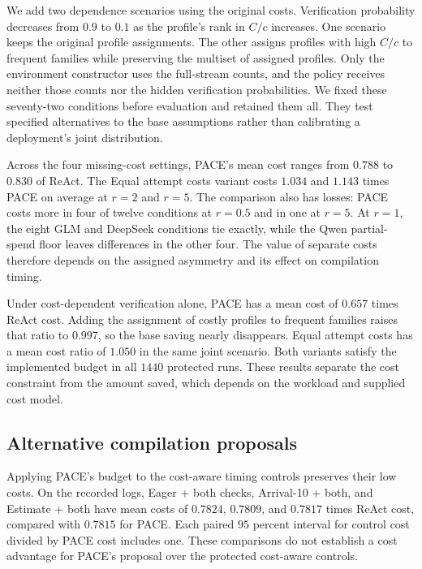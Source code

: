 We add two dependence scenarios using the original costs.
Verification probability decreases from $0.9$ to $0.1$ as the profile's rank in $C/c$ increases.
One scenario keeps the original profile assignments.
The other assigns profiles with high $C/c$ to frequent families while preserving the multiset of assigned profiles.
Only the environment constructor uses the full-stream counts, and the policy receives neither those counts nor the hidden verification probabilities.
We fixed these seventy-two conditions before evaluation and retained them all.
They test specified alternatives to the base assumptions rather than calibrating a deployment's joint distribution.



Across the four missing-cost settings, PACE's mean cost ranges from $0.788$ to $0.830$ of ReAct.
The Equal attempt costs variant costs $1.034$ and $1.143$ times PACE on average at $r=2$ and $r=5$.
The comparison also has losses: PACE costs more in four of twelve conditions at $r=0.5$ and in one at $r=5$.
At $r=1$, the eight GLM and DeepSeek conditions tie exactly, while the Qwen partial-spend floor leaves differences in the other four.
The value of separate costs therefore depends on the assigned asymmetry and its effect on compilation timing.

Under cost-dependent verification alone, PACE has a mean cost of $0.657$ times ReAct cost.
Adding the assignment of costly profiles to frequent families raises that ratio to $0.997$, so the base saving nearly disappears.
Equal attempt costs has a mean cost ratio of $1.050$ in the same joint scenario.
Both variants satisfy the implemented budget in all $1440$ protected runs.
These results separate the cost constraint from the amount saved, which depends on the workload and supplied cost model.

\subsection{Alternative compilation proposals}
\label{sec:matched-budget}

Applying PACE's budget to the cost-aware timing controls preserves their low costs.
On the recorded logs, Eager + both checks, Arrival-10 + both, and Estimate + both have mean costs of $0.7824$, $0.7809$, and $0.7817$ times ReAct cost, compared with $0.7815$ for PACE.
Each paired $95$ percent interval for control cost divided by PACE cost includes one.
These comparisons do not establish a cost advantage for PACE's proposal over the protected cost-aware controls.

